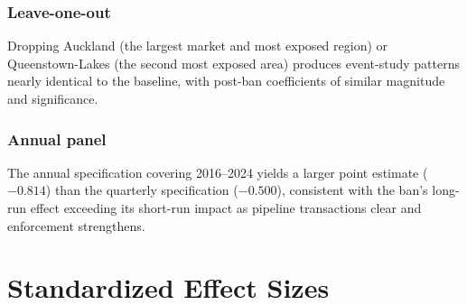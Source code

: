 \documentclass[12pt]{article}
\begin{document}
\subsubsection*{Leave-one-out} Dropping Auckland (the largest market and most exposed region) or Queenstown-Lakes (the second most exposed area) produces event-study patterns nearly identical to the baseline, with post-ban coefficients of similar magnitude and significance.

\subsubsection*{Annual panel} The annual specification covering 2016--2024 yields a larger point estimate ($-0.814$) than the quarterly specification ($-0.500$), consistent with the ban's long-run effect exceeding its short-run impact as pipeline transactions clear and enforcement strengthens.

\section{Standardized Effect Sizes}
\label{sec:sde}


\end{document}
